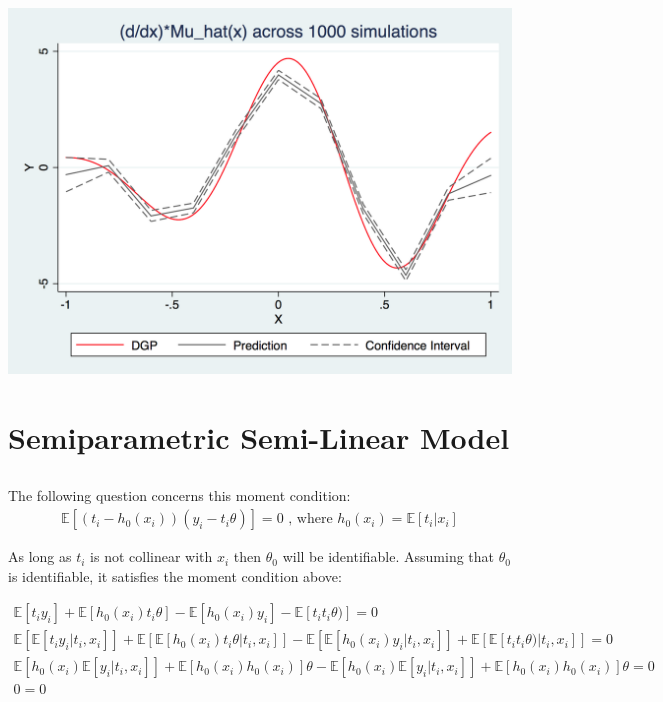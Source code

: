 \documentclass[12pt]{article}
\newcommand{\E}{\mathbb{E}}
\begin{document}
\subsubsection{}
\includegraphics[totalheight=4cm]{pset2q2d.png}

\newpage
\section{Semiparametric Semi-Linear Model}
\subsection{}

The following question concerns this moment condition:
\begin{gather*}
\E[(t_i - h_0(x_i))(y_i - t_i\theta)] = 0 \text{  , where }  h_0(x_i) = \E[t_i | x_i]
\end{gather*}

As long as $t_i$ is not collinear with $x_i$ then $\theta_0$ will be identifiable. Assuming that $\theta_0$ is identifiable, it satisfies the moment condition above:

\begin{gather*}
\E[t_i y_i] + \E[h_0(x_i)t_i\theta] - \E[h_0(x_i)y_i] - \E[t_i t_i\theta)] = 0 \\
\E[\E[t_i y_i |t_i, x_i]] + \E[\E[h_0(x_i)t_i\theta|t_i, x_i]]  - \E[\E[h_0(x_i)y_i |t_i, x_i]]  + \E[\E[t_it_i\theta) |t_i, x_i]]  = 0 \\
\E[h_0(x_i) \E[y_i |t_i, x_i]] + \E[h_0(x_i)h_0(x_i)]\theta  - \E[h_0(x_i) \E[y_i |t_i, x_i]]  + \E[h_0(x_i)h_0(x_i)]\theta   = 0 \\
0=0
\end{gather*}
\end{document}
